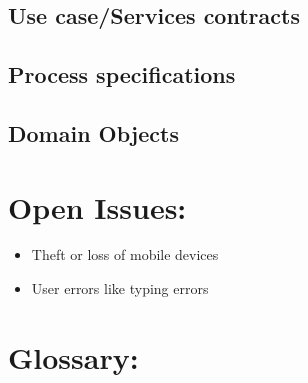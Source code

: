 \documentclass[12pt]{article}
\begin{document}
		\vspace{0.2in}
		
		\subsection{Use case/Services contracts} %
		\vspace{0.2in}
		
		\vspace{0.2in}
		
		\subsection{Process specifications} %
		\vspace{0.2in}
		
		\vspace{0.2in}
		
		\subsection{Domain Objects} %
		\vspace{0.2in}
		
		\vspace{0.5in}
		
	\newpage	
	\section{Open Issues:} %
	\vspace{0.2in}
	
	\begin{itemize}
		\item Theft or loss of mobile devices
		\item User errors like typing errors
	\end{itemize}
	
	
	\vspace{0.5in}
	
	\newpage
	\section{Glossary:} %
	\vspace{0.2in}
	
\end{document}
